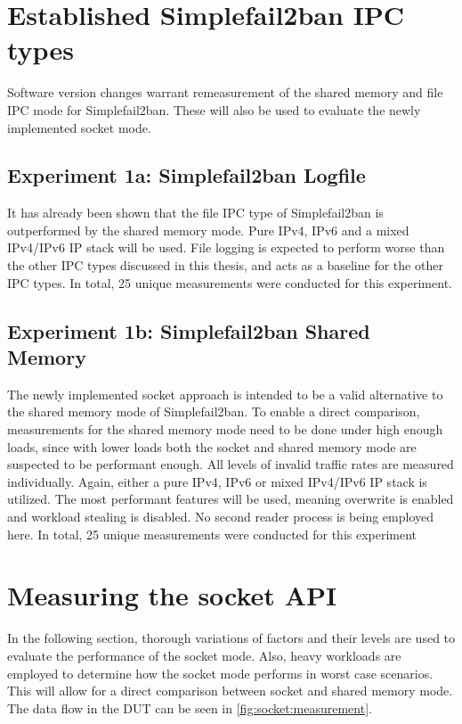 \section{Established Simplefail2ban \ac{IPC} types}
Software version changes warrant remeasurement of the shared memory and file \ac{IPC} mode for Simplefail2ban.
These will also be used to evaluate the newly implemented socket mode.

\subsection{Experiment 1a: Simplefail2ban Logfile}
It has already been shown that the file \ac{IPC} type of Simplefail2ban is outperformed by the shared memory mode.
Pure IPv4, IPv6 and a mixed IPv4/IPv6 \ac{IP} stack will be used.
File logging is expected to perform worse than the other \ac{IPC} types discussed in this thesis, and acts as a baseline for the other \ac{IPC} types.
In total, 25 unique measurements were conducted for this experiment.

\subsection{Experiment 1b: Simplefail2ban Shared Memory}
The newly implemented socket approach is intended to be a valid alternative to the shared memory mode of Simplefail2ban.
To enable a direct comparison, measurements for the shared memory mode need to be done under high enough loads, since with lower loads both the socket and shared memory mode are suspected to be performant enough.
All levels of invalid traffic rates are measured individually.
Again, either a pure IPv4, IPv6 or mixed IPv4/IPv6 \ac{IP} stack is utilized.
The most performant features will be used, meaning overwrite is enabled and workload stealing is disabled.
No second reader process is being employed here.
In total, 25 unique measurements were conducted for this experiment

\section{Measuring the socket \ac{API}}
In the following section, thorough variations of factors and their levels are used to evaluate the performance of the socket mode.
Also, heavy workloads are employed to determine how the socket mode performs in worst case scenarios.
This will allow for a direct comparison between socket and shared memory mode.
The data flow in the \ac{DUT} can be seen in \ref{fig:socket:measurement}.

